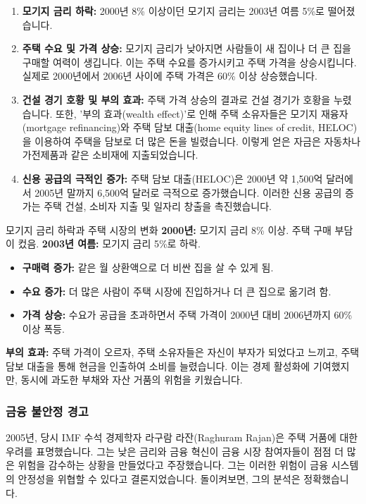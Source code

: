 \documentclass[11pt,a4paper]{article}
\begin{document}
\begin{enumerate}
    \item \textbf{모기지 금리 하락:}
    2000년 8\% 이상이던 모기지 금리는 2003년 여름 5\%로 떨어졌습니다.

    \item \textbf{주택 수요 및 가격 상승:}
    모기지 금리가 낮아지면 사람들이 새 집이나 더 큰 집을 구매할 여력이 생깁니다. 이는 주택 수요를 증가시키고 주택 가격을 상승시킵니다. 실제로 2000년에서 2006년 사이에 주택 가격은 60\% 이상 상승했습니다.

    \item \textbf{건설 경기 호황 및 부의 효과:}
    주택 가격 상승의 결과로 건설 경기가 호황을 누렸습니다. 또한, '부의 효과(wealth effect)'로 인해 주택 소유자들은 모기지 재융자(mortgage refinancing)와 주택 담보 대출(home equity lines of credit, HELOC)을 이용하여 주택을 담보로 더 많은 돈을 빌렸습니다. 이렇게 얻은 자금은 자동차나 가전제품과 같은 소비재에 지출되었습니다.

    \item \textbf{신용 공급의 극적인 증가:}
    주택 담보 대출(HELOC)은 2000년 약 1,500억 달러에서 2005년 말까지 6,500억 달러로 극적으로 증가했습니다. 이러한 신용 공급의 증가는 주택 건설, 소비자 지출 및 일자리 창출을 촉진했습니다.
\end{enumerate}

\begin{examplebox}{모기지 금리 하락과 주택 시장의 변화}
\textbf{2000년:} 모기지 금리 8\% 이상. 주택 구매 부담이 컸음.
\textbf{2003년 여름:} 모기지 금리 5\%로 하락.
\begin{itemize}
    \item \textbf{구매력 증가:} 같은 월 상환액으로 더 비싼 집을 살 수 있게 됨.
    \item \textbf{수요 증가:} 더 많은 사람이 주택 시장에 진입하거나 더 큰 집으로 옮기려 함.
    \item \textbf{가격 상승:} 수요가 공급을 초과하면서 주택 가격이 2000년 대비 2006년까지 60\% 이상 폭등.
\end{itemize}
\textbf{부의 효과:} 주택 가격이 오르자, 주택 소유자들은 자신이 부자가 되었다고 느끼고, 주택 담보 대출을 통해 현금을 인출하여 소비를 늘렸습니다. 이는 경제 활성화에 기여했지만, 동시에 과도한 부채와 자산 거품의 위험을 키웠습니다.
\end{examplebox}

\subsubsection{금융 불안정 경고}
2005년, 당시 IMF 수석 경제학자 라구람 라잔(Raghuram Rajan)은 주택 거품에 대한 우려를 표명했습니다. 그는 낮은 금리와 금융 혁신이 금융 시장 참여자들이 점점 더 많은 위험을 감수하는 상황을 만들었다고 주장했습니다. 그는 이러한 위험이 금융 시스템의 안정성을 위협할 수 있다고 결론지었습니다. 돌이켜보면, 그의 분석은 정확했습니다.
\end{document}
